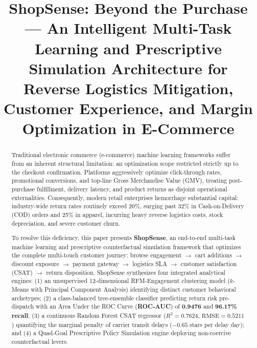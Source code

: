 \documentclass[conference]{IEEEtran}
\begin{document}
\title{ShopSense: Beyond the Purchase --- An Intelligent Multi-Task Learning and Prescriptive Simulation Architecture for Reverse Logistics Mitigation, Customer Experience, and Margin Optimization in E-Commerce}

\author{
}

\maketitle

\begin{abstract}
Traditional electronic commerce (e-commerce) machine learning frameworks suffer from an inherent structural limitation: an optimization scope restricted strictly up to the checkout confirmation. Platforms aggressively optimize click-through rates, promotional conversions, and top-line Gross Merchandise Value (GMV), treating post-purchase fulfillment, delivery latency, and product returns as disjoint operational externalities. Consequently, modern retail enterprises hemorrhage substantial capital: industry-wide return rates routinely exceed 20\%, surging past 32\% in Cash-on-Delivery (COD) orders and 25\% in apparel, incurring heavy reverse logistics costs, stock depreciation, and severe customer churn.

To resolve this deficiency, this paper presents \textbf{ShopSense}, an end-to-end multi-task machine learning and prescriptive counterfactual simulation framework that optimizes the complete multi-touch customer journey: browse engagement $\to$ cart additions $\to$ discount exposure $\to$ payment gateway $\to$ logistics SLA $\to$ customer satisfaction (CSAT) $\to$ return disposition. ShopSense synthesizes four integrated analytical engines: (1) an unsupervised 12-dimensional RFM-Engagement clustering model ($k$-Means with Principal Component Analysis) identifying distinct customer behavioral archetypes; (2) a class-balanced tree-ensemble classifier predicting return risk pre-dispatch with an Area Under the ROC Curve (\textbf{ROC-AUC}) of \textbf{0.9476} and \textbf{96.17\% recall}; (3) a continuous Random Forest CSAT regressor ($R^2 = 0.7624$, $\text{RMSE} = 0.5211$) quantifying the marginal penalty of carrier transit delays ($-0.65$ stars per delay day); and (4) a Quad-Goal Prescriptive Policy Simulation engine deploying non-coercive counterfactual levers.


\end{abstract}
\end{document}
